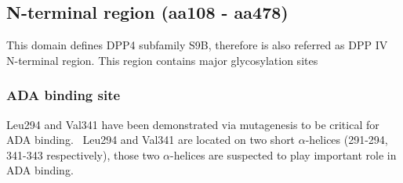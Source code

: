 \subsection{N-terminal region (aa108 - aa478)}

This domain defines DPP4 subfamily S9B, therefore is also referred as DPP IV N-terminal region. This region contains major glycosylation sites 

\subsubsection{ADA binding site}
Leu294 and Val341 have been demonstrated via mutagenesis to be critical for ADA binding.~\cite{Abbott_1999} Leu294 and Val341 are located on two short $\alpha$-helices (291-294, 341-343 respectively), those two $\alpha$-helices are suspected to play important role in ADA binding. 